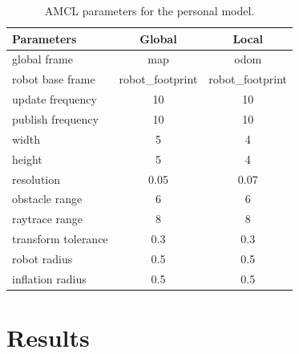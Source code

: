 \documentclass[10pt,journal,compsoc]{IEEEtran}
\begin{document}
\begin{table}[ht]
\caption{AMCL parameters for the personal model.}
\label{tab:costmapParam-Tankbot}
\begin{center}
    \begin{tabular}{lcc}
        \toprule%
\textbf{Parameters} & \textbf{Global}  & \textbf{Local}   \\
\midrule
global frame        & map              & odom             \\
robot base frame    & robot\_footprint & robot\_footprint \\
update frequency    & 10               & 10               \\
publish frequency   & 10               & 10               \\
width               & 5                & 4                \\
height              & 5                & 4                \\
resolution          & 0.05             & 0.07             \\
obstacle range      & 6                & 6                \\
raytrace range      & 8                & 8                \\
transform tolerance & 0.3              & 0.3              \\
robot radius        & 0.5              & 0.5              \\
inflation radius    & 0.5              & 0.5             \\
    \bottomrule%
\end{tabular}
\end{center}
\end{table}

\section{Results}

\end{document}
